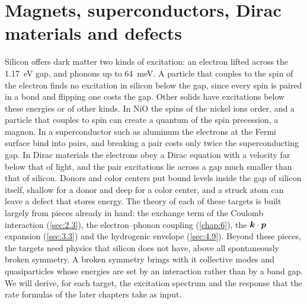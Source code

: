 \chapter{Magnets, superconductors, Dirac materials and defects}\label{chap:7}

Silicon offers dark matter two kinds of excitation: an electron lifted across the \SI{1.17}{eV} gap, and phonons up to \SI{64}{meV}. A particle that couples to the spin of the electron finds no excitation in silicon below the gap, since every spin is paired in a bond and flipping one costs the gap. Other solids have excitations below these energies or of other kinds. In NiO the spins of the nickel ions order, and a particle that couples to spin can create a quantum of the spin precession, a magnon. In a superconductor such as aluminum the electrons at the Fermi surface bind into pairs, and breaking a pair costs only twice the superconducting gap. In Dirac materials the electrons obey a Dirac equation with a velocity far below that of light, and the pair excitations lie across a gap much smaller than that of silicon. Donors and color centers put bound levels inside the gap of silicon itself, shallow for a donor and deep for a color center, and a struck atom can leave a defect that stores energy. The theory of each of these targets is built largely from pieces already in hand: the exchange term of the Coulomb interaction (\cref{sec:2.3}), the electron--phonon coupling (\cref{chap:6}), the $\bm{k}\cdot\bm{p}$ expansion (\cref{sec:3.3}) and the hydrogenic envelope (\cref{sec:4.9}). Beyond these pieces, the targets need physics that silicon does not have, above all spontaneously broken symmetry. A broken symmetry brings with it collective modes and quasiparticles whose energies are set by an interaction rather than by a band gap. We will derive, for each target, the excitation spectrum and the response that the rate formulas of the later chapters take as input.





\printbibliography[heading=subbibliography]
